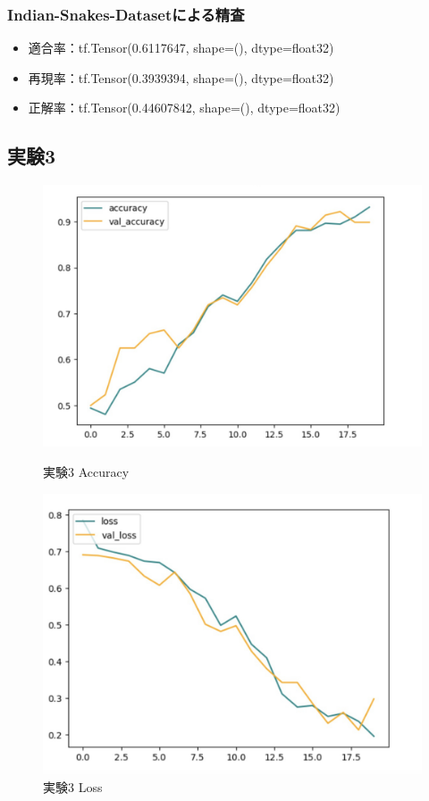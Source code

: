 \documentclass[a4paper, 11pt, titlepage]{jsarticle}
\begin{document}
\subsubsection{Indian-Snakes-Datasetによる精査}
\begin{itemize}
\item 適合率：tf.Tensor(0.6117647, shape=(), dtype=float32)
\item 再現率：tf.Tensor(0.3939394, shape=(), dtype=float32) 
\item 正解率：tf.Tensor(0.44607842, shape=(), dtype=float32)
\end{itemize}

\clearpage

\subsection{実験3}
\begin{figure}[htbp]
  \begin{minipage}[b]{0.45\linewidth}
    \centering
    \includegraphics[keepaspectratio, scale=0.161]{ex3_acc.jpg}
    \caption{実験3 Accuracy}
  \end{minipage}
  \begin{minipage}[b]{0.45\linewidth}
    \centering
    \includegraphics[keepaspectratio, scale=0.161]{ex3_loss.jpg}
    \caption{実験3 Loss}
  \end{minipage}
\end{figure}
\end{document}
